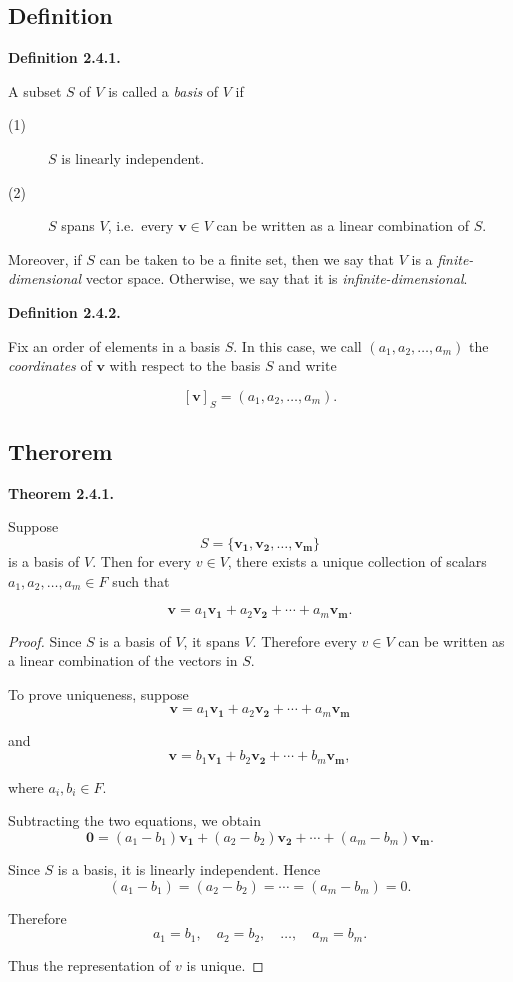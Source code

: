 \documentclass[12pt]{article}
\begin{document}
\subsection{Definition}

\textbf{Definition 2.4.1.}

A subset $S$ of $V$ is called a \emph{basis} of $V$ if

\begin{description}
    \item[(1)] $S$ is linearly independent.
    \item[(2)] $S$ spans $V$, i.e.\ every $\mathbf{v}\in V$ can be written as a linear combination of $S$.
\end{description}

Moreover, if $S$ can be taken to be a finite set, then we say that $V$ is a
\emph{finite-dimensional} vector space. Otherwise, we say that it is
\emph{infinite-dimensional}.

\bigskip

\textbf{Definition 2.4.2.}

Fix an order of elements in a basis $S$. In this case, we call
$(a_1,a_2,\ldots,a_m)$ the \emph{coordinates} of $\mathbf{v}$ with respect to the basis
$S$ and write

\[
[\mathbf{v}]_S=(a_1,a_2,\ldots,a_m).
\]

\subsection{Therorem}

\textbf{Theorem 2.4.1.}

Suppose
\[
S=\{\mathbf{v_1,v_2,\ldots,v_m}\}
\]
is a basis of $V$. Then for every $v\in V$, there exists a unique collection of scalars
$a_1,a_2,\ldots,a_m\in F$ such that

\[
\mathbf{v}=a_1\mathbf{v_1}+a_2\mathbf{v_2}+\cdots+a_m\mathbf{v_m}.
\]

\begin{proof}
Since $S$ is a basis of $V$, it spans $V$. Therefore every $v\in V$ can be
written as a linear combination of the vectors in $S$.

To prove uniqueness, suppose
\[
\mathbf{v}=a_1\mathbf{v_1}+a_2\mathbf{v_2}+\cdots+a_m\mathbf{v_m}
\]

and
\[
\mathbf{v}=b_1\mathbf{v_1}+b_2\mathbf{v_2}+\cdots+b_m\mathbf{v_m},
\]

where $a_i,b_i\in F$.

Subtracting the two equations, we obtain
\[
\mathbf{0}=(a_1-b_1)\mathbf{v_1}+(a_2-b_2)\mathbf{v_2}+\cdots+(a_m-b_m)\mathbf{v_m}.
\]

Since $S$ is a basis, it is linearly independent. Hence
\[
(a_1-b_1)=(a_2-b_2)=\cdots=(a_m-b_m)=0.
\]

Therefore
\[
a_1=b_1,\quad a_2=b_2,\quad \ldots,\quad a_m=b_m.
\]

Thus the representation of $v$ is unique.
\end{proof}
\end{document}
